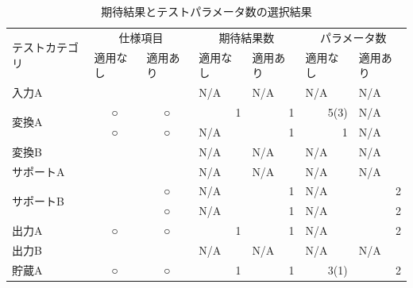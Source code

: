 \begin{table}[htbp]
  \centering
  \caption{期待結果とテストパラメータ数の選択結果}
    \begin{tabular}{|l|r|r|r|r|r|r|}
    \hline
    \multirow{2}[4]{*}{テストカテゴリ} & \multicolumn{2}{c|}{仕様項目} & \multicolumn{2}{c|}{期待結果数} & \multicolumn{2}{c|}{パラメータ数} \bigstrut\\
\cline{2-7}          & \multicolumn{1}{l|}{適用なし} & \multicolumn{1}{l|}{適用あり} & \multicolumn{1}{l|}{適用なし} & \multicolumn{1}{l|}{適用あり} & \multicolumn{1}{l|}{適用なし} & \multicolumn{1}{l|}{適用あり} \bigstrut\\
    \hline
    \hline
    入力A   &       &       & \multicolumn{1}{l|}{N/A} & \multicolumn{1}{l|}{N/A} & \multicolumn{1}{l|}{N/A} & \multicolumn{1}{l|}{N/A} \bigstrut\\
    \hline
    \multirow{2}[4]{*}{変換A} & \multicolumn{1}{c|}{○} & \multicolumn{1}{c|}{○} & 1     & 1     & 5(3)  & \multicolumn{1}{l|}{N/A} \bigstrut\\
\cline{2-7}          & \multicolumn{1}{c|}{○} & \multicolumn{1}{c|}{○} & \multicolumn{1}{l|}{N/A} & 1     & 1     & \multicolumn{1}{l|}{N/A} \bigstrut\\
    \hline
    変換B   &       &       & \multicolumn{1}{l|}{N/A} & \multicolumn{1}{l|}{N/A} & \multicolumn{1}{l|}{N/A} & \multicolumn{1}{l|}{N/A} \bigstrut\\
    \hline
    サポートA &       &       & \multicolumn{1}{l|}{N/A} & \multicolumn{1}{l|}{N/A} & \multicolumn{1}{l|}{N/A} & \multicolumn{1}{l|}{N/A} \bigstrut\\
    \hline
    \multirow{2}[4]{*}{サポートB} &       & \multicolumn{1}{c|}{○} & \multicolumn{1}{l|}{N/A} & 1     & \multicolumn{1}{l|}{N/A} & 2 \bigstrut\\
\cline{2-7}          &       & \multicolumn{1}{c|}{○} & \multicolumn{1}{l|}{N/A} & 1     & \multicolumn{1}{l|}{N/A} & 2 \bigstrut\\
    \hline
    出力A   & \multicolumn{1}{c|}{○} & \multicolumn{1}{c|}{○} & 1     & 1     & \multicolumn{1}{l|}{N/A} & 2 \bigstrut\\
    \hline
    出力B   &       &       & \multicolumn{1}{l|}{N/A} & \multicolumn{1}{l|}{N/A} & \multicolumn{1}{l|}{N/A} & \multicolumn{1}{l|}{N/A} \bigstrut\\
    \hline
    貯蔵A   & \multicolumn{1}{c|}{○} & \multicolumn{1}{c|}{○} & 1     & 1     & 3(1)  & 2 \bigstrut\\

\end{tabular}
\end{table}
